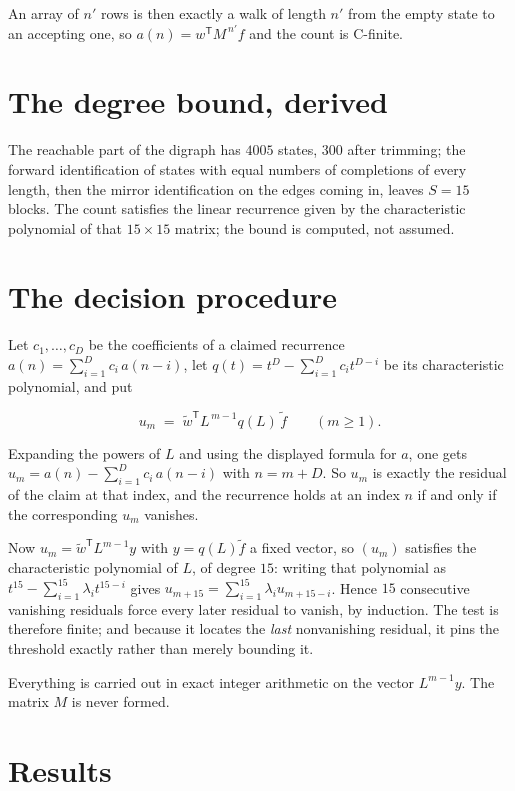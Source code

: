\documentclass[11pt]{article}
\theoremstyle{definition}
\begin{document}
An array of $n'$ rows is then exactly a walk of length $n'$ from the empty state to an accepting one, so $a(n) = w^{\mathsf T}M^{\,n'}f$ and the count is C-finite.

\section{The degree bound, derived}

The reachable part of the digraph has $4005$ states, $300$ after trimming; the forward identification of states with equal numbers of completions of every length, then the mirror identification on the edges coming in, leaves $S = 15$ blocks. The count satisfies the linear recurrence given by the characteristic polynomial of that $15\times15$ matrix; the bound is computed, not assumed.

\section{The decision procedure}

Let $c_1,\dots,c_D$ be the coefficients of a claimed recurrence $a(n) = \sum_{i=1}^{D} c_i\,a(n-i)$, let $q(t) = t^{D} - \sum_{i=1}^{D} c_i t^{D-i}$ be its characteristic polynomial, and put

\[u_m \;=\; \tilde w^{\mathsf T} L^{\,m-1} q(L)\,\tilde f \qquad (m \ge 1).\]

Expanding the powers of $L$ and using the displayed formula for $a$, one gets $u_m = a(n) - \sum_{i=1}^{D} c_i\,a(n-i)$ with $n = m + D$. So $u_m$ is exactly the residual of the claim at that index, and the recurrence holds at an index $n$ if and only if the corresponding $u_m$ vanishes.

Now $u_m = \tilde w^{\mathsf T} L^{m-1} y$ with $y = q(L)\tilde f$ a fixed vector, so $(u_m)$ satisfies the characteristic polynomial of $L$, of degree $15$: writing that polynomial as $t^{15} - \sum_{i=1}^{15} \lambda_i t^{15-i}$ gives $u_{m+15} = \sum_{i=1}^{15} \lambda_i u_{m+15-i}$. Hence $15$ consecutive vanishing residuals force every later residual to vanish, by induction. The test is therefore finite; and because it locates the {\itshape last} nonvanishing residual, it pins the threshold exactly rather than merely bounding it.

Everything is carried out in exact integer arithmetic on the vector $L^{m-1}y$. The matrix $M$ is never formed.

\section{Results}
\end{document}
